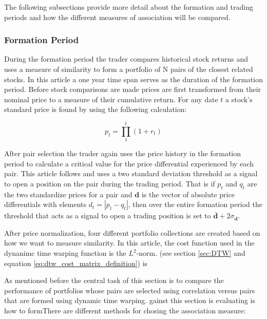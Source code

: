 \documentclass[12pt]{article}
\begin{document}
The following subsections provide more detail about the formation and trading periods and how the different measures of association will be compared.

\subsubsection{Formation Period}

During the formation period the trader compares historical stock returns and uses a measure of similarity to form a portfolio of N pairs of the closest related stocks. In this article a one year time span serves as the duration of the formation period. Before stock comparisons are made prices are first transformed from their nominal price to a measure of their cumulative return. For any date $t$ a stock's standard price is found by using the following calculation:

\begin{equation} \label{eq:standard_price}
    p_{t} = \prod_{1}^{t} (1 + r_{t})
\end{equation}

After pair selection the trader again uses the price history in the formation period to calculate a critical value for the price differential experienced by each pair. This article follows \cite{Gatev_et_al_2006} and uses a two standard deviation threshold as a signal to open a position on the pair during the trading period. That is if $p_{t}$ and $q_{t}$ are the two standardize prices for a pair and $\boldsymbol{d}$ is the vector of absolute price differentials with elements $d_{t} = |p_{t} - q_{t}|$, then over the entire formation period the threshold that acts as a signal to open a trading position is set to $\boldsymbol{\bar{d}} + 2 \sigma_{\boldsymbol{d}}$.

After price normalization, four different portfolio collections are created based on how we want to measure similarity. In this article, the cost function used in the dynanimc time warping function is the $L^{2}$-norm. (see section \ref{sec:DTW} and equation \ref{eq:dtw_cost_matrix_definition}) is 


As mentioned before the central task of this section is to compare the performance of portfolios whose pairs are selected using correlation versus pairs that are formed using dynamic time warping. gainst  this section is evaluating is how to formThere are different methods for chosing the association measure:
\end{document}
